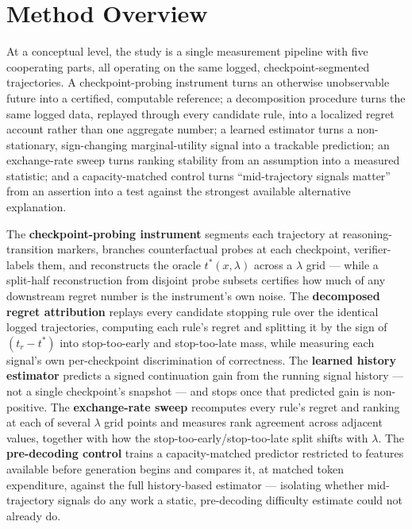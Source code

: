\documentclass[11pt]{article}
\begin{document}
\section{Method Overview}

At a conceptual level, the study is a single measurement pipeline with five cooperating parts, all operating on the same logged, checkpoint-segmented trajectories. A checkpoint-probing instrument turns an otherwise unobservable future into a certified, computable reference; a decomposition procedure turns the same logged data, replayed through every candidate rule, into a localized regret account rather than one aggregate number; a learned estimator turns a non-stationary, sign-changing marginal-utility signal into a trackable prediction; an exchange-rate sweep turns ranking stability from an assumption into a measured statistic; and a capacity-matched control turns ``mid-trajectory signals matter'' from an assertion into a test against the strongest available alternative explanation.

The \textbf{checkpoint-probing instrument} segments each trajectory at reasoning-transition markers, branches counterfactual probes at each checkpoint, verifier-labels them, and reconstructs the oracle $t^*(x, \lambda)$ across a $\lambda$ grid --- while a split-half reconstruction from disjoint probe subsets certifies how much of any downstream regret number is the instrument's own noise. The \textbf{decomposed regret attribution} replays every candidate stopping rule over the identical logged trajectories, computing each rule's regret and splitting it by the sign of $(t_r - t^*)$ into stop-too-early and stop-too-late mass, while measuring each signal's own per-checkpoint discrimination of correctness. The \textbf{learned history estimator} predicts a signed continuation gain from the running signal history --- not a single checkpoint's snapshot --- and stops once that predicted gain is non-positive. The \textbf{exchange-rate sweep} recomputes every rule's regret and ranking at each of several $\lambda$ grid points and measures rank agreement across adjacent values, together with how the stop-too-early/stop-too-late split shifts with $\lambda$. The \textbf{pre-decoding control} trains a capacity-matched predictor restricted to features available before generation begins and compares it, at matched token expenditure, against the full history-based estimator --- isolating whether mid-trajectory signals do any work a static, pre-decoding difficulty estimate could not already do.
\end{document}
